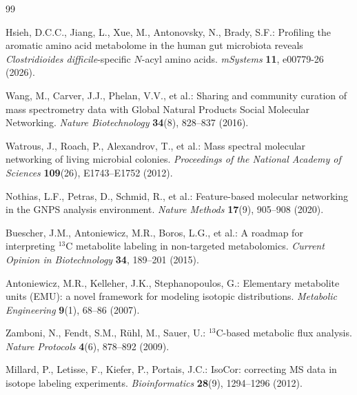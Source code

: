 \documentclass[11pt,twoside,openright]{book}
\begin{document}

\begin{thebibliography}{99}
\small

Hsieh, D.C.C., Jiang, L., Xue, M., Antonovsky, N., Brady, S.F.: Profiling the aromatic amino acid metabolome in the human gut microbiota reveals \textit{Clostridioides difficile}-specific $N$-acyl amino acids.
\textit{mSystems} \textbf{11}, e00779-26 (2026).

Wang, M., Carver, J.J., Phelan, V.V., et al.: Sharing and community curation of mass spectrometry data with Global Natural Products Social Molecular Networking.
\textit{Nature Biotechnology} \textbf{34}(8), 828--837 (2016).

Watrous, J., Roach, P., Alexandrov, T., et al.: Mass spectral molecular networking of living microbial colonies.
\textit{Proceedings of the National Academy of Sciences} \textbf{109}(26), E1743--E1752 (2012).

Nothias, L.F., Petras, D., Schmid, R., et al.: Feature-based molecular networking in the GNPS analysis environment.
\textit{Nature Methods} \textbf{17}(9), 905--908 (2020).

Buescher, J.M., Antoniewicz, M.R., Boros, L.G., et al.: A roadmap for interpreting $^{13}\text{C}$ metabolite labeling in non-targeted metabolomics.
\textit{Current Opinion in Biotechnology} \textbf{34}, 189--201 (2015).

Antoniewicz, M.R., Kelleher, J.K., Stephanopoulos, G.: Elementary metabolite units (EMU): a novel framework for modeling isotopic distributions.
\textit{Metabolic Engineering} \textbf{9}(1), 68--86 (2007).

Zamboni, N., Fendt, S.M., R{\"u}hl, M., Sauer, U.: $^{13}\text{C}$-based metabolic flux analysis.
\textit{Nature Protocols} \textbf{4}(6), 878--892 (2009).

Millard, P., Letisse, F., Kiefer, P., Portais, J.C.: IsoCor: correcting MS data in isotope labeling experiments.
\textit{Bioinformatics} \textbf{28}(9), 1294--1296 (2012).


\end{thebibliography}
\end{document}
